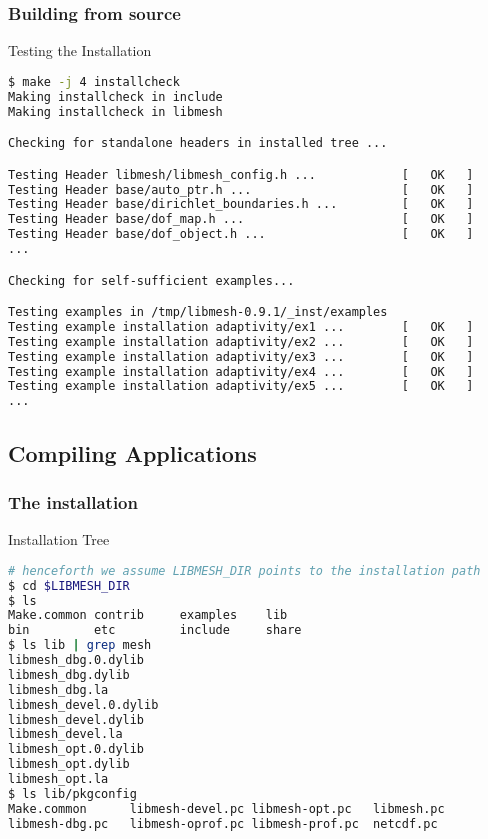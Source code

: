 \begin{frame}
  \frametitle{Building \libMesh{} from source}

  \begin{block}{Testing the Installation}
    \begin{lstlisting}[language=bash]
$ make -j 4 installcheck
Making installcheck in include
Making installcheck in libmesh

Checking for standalone headers in installed tree ...

Testing Header libmesh/libmesh_config.h ...            [   OK   ]
Testing Header base/auto_ptr.h ...                     [   OK   ]
Testing Header base/dirichlet_boundaries.h ...         [   OK   ]
Testing Header base/dof_map.h ...                      [   OK   ]
Testing Header base/dof_object.h ...                   [   OK   ]
...

Checking for self-sufficient examples...

Testing examples in /tmp/libmesh-0.9.1/_inst/examples
Testing example installation adaptivity/ex1 ...        [   OK   ]
Testing example installation adaptivity/ex2 ...        [   OK   ]
Testing example installation adaptivity/ex3 ...        [   OK   ]
Testing example installation adaptivity/ex4 ...        [   OK   ]
Testing example installation adaptivity/ex5 ...        [   OK   ]
...
    \end{lstlisting}
  \end{block}
\end{frame}



\subsection{Compiling Applications}
\frame
{
  \Large
  \begin{block}{}
  \end{block}
}



\begin{frame}
  \frametitle{The \libMesh{} installation}

  \begin{block}{Installation Tree}
    \begin{lstlisting}[language=bash]
# henceforth we assume LIBMESH_DIR points to the installation path
$ cd $LIBMESH_DIR
$ ls
Make.common contrib     examples    lib
bin         etc         include     share
$ ls lib | grep mesh
libmesh_dbg.0.dylib
libmesh_dbg.dylib
libmesh_dbg.la
libmesh_devel.0.dylib
libmesh_devel.dylib
libmesh_devel.la
libmesh_opt.0.dylib
libmesh_opt.dylib
libmesh_opt.la
$ ls lib/pkgconfig
Make.common      libmesh-devel.pc libmesh-opt.pc   libmesh.pc
libmesh-dbg.pc   libmesh-oprof.pc libmesh-prof.pc  netcdf.pc
    \end{lstlisting}
  \end{block}
\end{frame}



